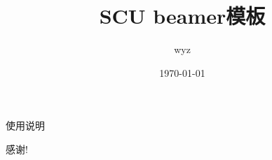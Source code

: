 \usepackage{beamer}

\title{SCU beamer模板}
\author{wyz}
\date{\today}



\begin{flame}

\begin{block}{使用说明}

\end{block}

\end{flame}


\begin{flame}
感谢!
\end{flame}


